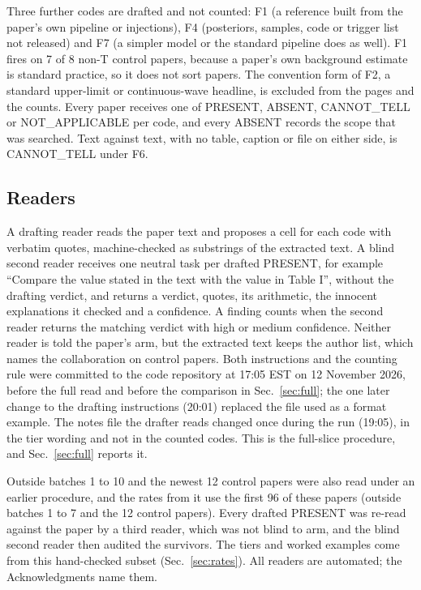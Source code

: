 \documentclass[reprint,amsmath,amssymb,aps,superscriptaddress,nofootinbib]{revtex4-2}
\begin{document}
Three further codes are drafted and not counted: F1 (a reference built from the paper's own pipeline or injections), F4 (posteriors, samples, code or trigger list not released) and F7 (a simpler model or the standard pipeline does as well). F1 fires on 7 of 8 non-T control papers, because a paper's own background estimate is standard practice, so it does not sort papers. The convention form of F2, a standard upper-limit or continuous-wave headline, is excluded from the pages and the counts. Every paper receives one of PRESENT, ABSENT, CANNOT\_TELL or NOT\_APPLICABLE per code, and every ABSENT records the scope that was searched. Text against text, with no table, caption or file on either side, is CANNOT\_TELL under F6.

\subsection{Readers}

A drafting reader reads the paper text and proposes a cell for each code with verbatim quotes, machine-checked as substrings of the extracted text. A blind second reader receives one neutral task per drafted PRESENT, for example ``Compare the value stated in the text with the value in Table I'', without the drafting verdict, and returns a verdict, quotes, its arithmetic, the innocent explanations it checked and a confidence. A finding counts when the second reader returns the matching verdict with high or medium confidence. Neither reader is told the paper's arm, but the extracted text keeps the author list, which names the collaboration on control papers. Both instructions and the counting rule were committed to the code repository at 17:05 EST on 12 November 2026, before the full read and before the comparison in Sec.~\ref{sec:full}; the one later change to the drafting instructions (20:01) replaced the file used as a format example. The notes file the drafter reads changed once during the run (19:05), in the tier wording and not in the counted codes. This is the full-slice procedure, and Sec.~\ref{sec:full} reports it.

Outside batches 1 to 10 and the newest 12 control papers were also read under an earlier procedure, and the rates from it use the first 96 of these papers (outside batches 1 to 7 and the 12 control papers). Every drafted PRESENT was re-read against the paper by a third reader, which was not blind to arm, and the blind second reader then audited the survivors. The tiers and worked examples come from this hand-checked subset (Sec.~\ref{sec:rates}). All readers are automated; the Acknowledgments name them.
\end{document}

